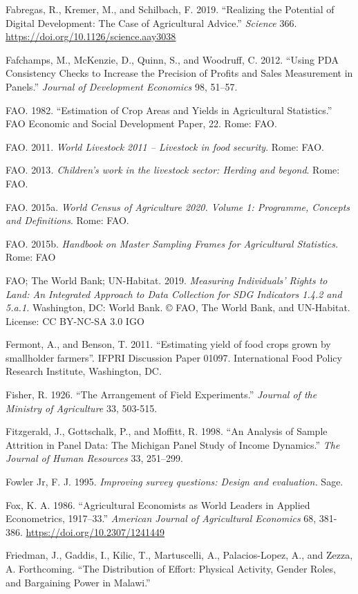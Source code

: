 \documentclass[
]{book}
\begin{document}
Fabregas, R., Kremer, M., and Schilbach, F. 2019. ``Realizing the Potential of Digital Development: The Case of Agricultural Advice.'' \emph{Science} 366. \url{https://doi.org/10.1126/science.aay3038}

Fafchamps, M., McKenzie, D., Quinn, S., and Woodruff, C. 2012. ``Using PDA Consistency Checks to Increase the Precision of Profits and Sales Measurement in Panels.'' \emph{Journal of Development Economics} 98, 51--57.

FAO. 1982. ``Estimation of Crop Areas and Yields in Agricultural Statistics.'' FAO Economic and Social Development Paper, 22. Rome: FAO.

FAO. 2011. \emph{World Livestock 2011 -- Livestock in food security}. Rome: FAO.

FAO. 2013\emph{. Children's work in the livestock sector: Herding and beyond}. Rome: FAO.

FAO. 2015a. \emph{World Census of Agriculture 2020. Volume 1: Programme, Concepts and Definitions}. Rome: FAO.

FAO. 2015b. \emph{Handbook on Master Sampling Frames for Agricultural Statistics.} Rome: FAO

FAO; The World Bank; UN-Habitat. 2019. \emph{Measuring Individuals' Rights to Land: An Integrated Approach to Data Collection for SDG Indicators 1.4.2 and 5.a.1.} Washington, DC: World Bank. © FAO, The World Bank, and UN-Habitat. License: CC BY-NC-SA 3.0 IGO

Fermont, A., and Benson, T. 2011. ``Estimating yield of food crops grown by smallholder farmers''. IFPRI Discussion Paper 01097. International Food Policy Research Institute, Washington, DC.

Fisher, R. 1926. ``The Arrangement of Field Experiments.'' \emph{Journal of the Ministry of Agriculture} 33, 503-515.

Fitzgerald, J., Gottschalk, P., and Moffitt, R. 1998. ``An Analysis of Sample Attrition in Panel Data: The Michigan Panel Study of Income Dynamics.'' \emph{The Journal of Human Resources} 33, 251--299.

Fowler Jr, F. J. 1995. \emph{Improving survey questions: Design and evaluation.} Sage.

Fox, K. A. 1986. ``Agricultural Economists as World Leaders in Applied Econometrics, 1917--33.'' \emph{American Journal of Agricultural Economics} 68, 381-386. \url{https://doi.org/10.2307/1241449}

Friedman, J., Gaddis, I., Kilic, T., Martuscelli, A., Palacios-Lopez, A., and Zezza, A. Forthcoming. ``The Distribution of Effort: Physical Activity, Gender Roles, and Bargaining Power in Malawi.''
\end{document}
